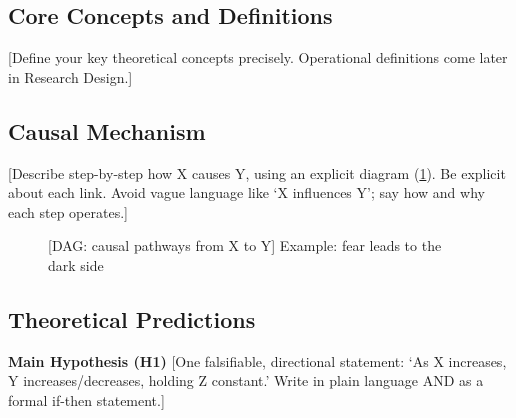 \subsection{Core Concepts and Definitions} %
[Define your key theoretical concepts precisely. Operational definitions come later in Research Design.]

\subsection{Causal Mechanism} %
[Describe step-by-step how X causes Y, using an explicit diagram (\cref{fig:dag}). Be explicit about each link. Avoid vague language like `X influences Y'; say how and why each step operates.]

\begin{figure}[htbp]
    \centering
    \footnotesize
    \caption{[DAG: causal pathways from X to Y] Example: fear leads to the dark side}
    \label{fig:dag}
\end{figure}

\subsection{Theoretical Predictions} %

\textbf{Main Hypothesis (H1)}
[One falsifiable, directional statement: `As X increases, Y increases/decreases, holding Z constant.' Write in plain language AND as a formal if-then statement.]

